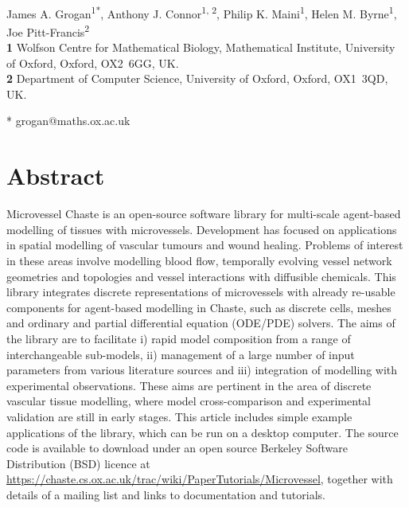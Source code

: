 \documentclass[10pt,letterpaper]{article}
\date{}
\begin{document}
\vspace*{0.2in}

\begin{flushleft}
{\Large
\textbf{} %
}
\newline
\\
James A. Grogan\textsuperscript{1*},
Anthony J. Connor\textsuperscript{1, 2},
Philip K. Maini\textsuperscript{1},
Helen M. Byrne\textsuperscript{1},
Joe Pitt-Francis\textsuperscript{2}
\\
\bigskip
\textbf{1} Wolfson Centre for Mathematical Biology, Mathematical Institute, University of Oxford, Oxford, \mbox{OX2 6GG}, UK.
\\
\textbf{2} Department of Computer Science, University of Oxford, Oxford, \mbox{OX1 3QD}, UK.
\\
\bigskip

* grogan@maths.ox.ac.uk

\end{flushleft}

\section*{Abstract}
Microvessel Chaste is an open-source software library for multi-scale agent-based modelling of tissues with microvessels. Development has focused on applications in spatial modelling of vascular tumours and wound healing. Problems of interest in these areas involve modelling blood flow, temporally evolving vessel network geometries and topologies and vessel interactions with diffusible chemicals. This library integrates discrete representations of microvessels with already re-usable components for agent-based modelling in Chaste, such as discrete cells, meshes and ordinary and partial differential equation (ODE/PDE) solvers. The aims of the library are to facilitate i) rapid model composition from a range of interchangeable sub-models, ii) management of a large number of input parameters from various literature sources and iii) integration of modelling with experimental observations. These aims are pertinent in the area of discrete vascular tissue modelling, where model cross-comparison and experimental validation are still in early stages. This article includes simple example applications of the library, which can be run on a desktop computer. The source code is available to download under an open source Berkeley Software Distribution (BSD) licence at \url{https://chaste.cs.ox.ac.uk/trac/wiki/PaperTutorials/Microvessel}, together with details of a mailing list and links to documentation and tutorials.
\end{document}
